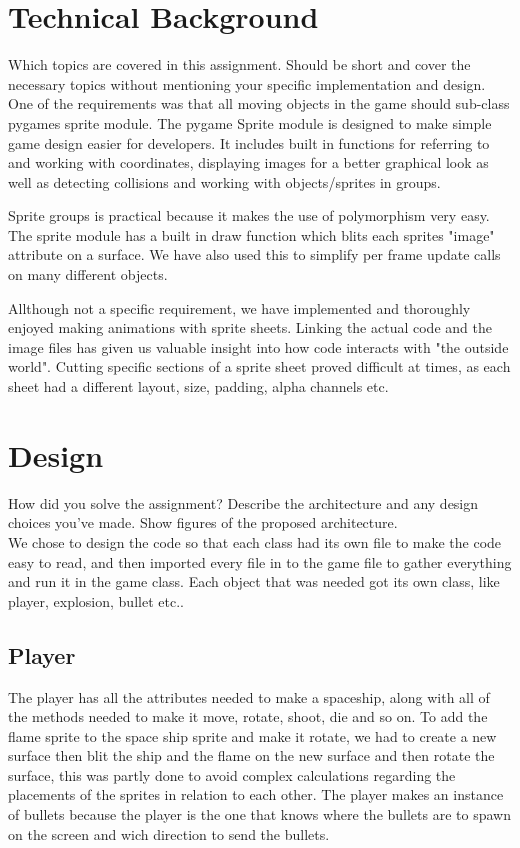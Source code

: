 \section{Technical Background}

Which topics are covered in this assignment. Should be short and cover the necessary topics without mentioning your specific implementation and design.\\

One of the requirements was that all moving objects in the game should sub-class
pygames sprite module. The pygame Sprite module is designed to make simple game 
design easier for developers. It includes built in functions for referring to 
and working with coordinates, displaying images for a better graphical look as
well as detecting collisions and working with objects/sprites in groups. 

Sprite groups is practical because it makes the use of polymorphism very easy.
The sprite module has a built in draw function which blits each sprites "image" 
attribute on a surface. We have also used this to simplify per frame update calls
on many different objects.

Allthough not a specific requirement, we have implemented and thoroughly enjoyed 
making animations with sprite sheets. Linking the actual code and the image 
files has given us valuable insight into how code interacts with "the outside world".
Cutting specific sections of a sprite sheet proved difficult at times, as each sheet
had a different layout, size, padding, alpha channels etc. 

\section{Design}

How did you solve the assignment? Describe the architecture and any design choices you've made. Show figures of the proposed architecture.\\ 

We chose to design the code so that each class had its own file to make the code easy to read, and then imported every file in to the game file to gather everything and run it in the game class. Each object that was needed got its own class, like player, explosion, bullet etc.. \\

\subsection{Player}
The player has all the attributes needed to make a spaceship, along with all of the methods needed to make it move, rotate, shoot, die and so on. To add the flame sprite to the space ship sprite and make it rotate, we had to create a new surface then blit the ship and the flame on the new surface and then rotate  the surface, this was partly done to avoid complex calculations regarding the placements of the sprites in relation to each other. The player makes an instance of bullets because the player is the one that knows where the bullets are to spawn on the screen and wich direction to send the bullets.

